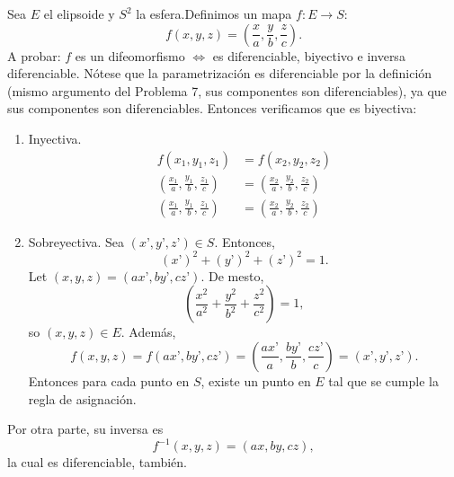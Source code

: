 \begin{problema}
\begin{enumerate}
\begin{sol}
            Sea $E$ el elipsoide y $S^2$ la esfera.Definimos un mapa $f: E \rightarrow S$:  $$ f(x,y,z) = \left(\frac{x}{a},\frac{y}{b},\frac{z}{c}\right). $$ A probar: $f$ es un difeomorfismo $\iff$ es diferenciable, biyectivo e inversa diferenciable. Nótese que la parametrización es diferenciable por la definición (mismo argumento del Problema 7, sus componentes son diferenciables), ya que sus componentes son diferenciables. Entonces verificamos que es biyectiva: 
            \begin{enumerate}
                \item Inyectiva. 
                \begin{align*}
                    f(x_1,y_1,z_1) &= f(x_2,y_2,z_2)\\
                    \left(\frac{x_1}{a},\frac{y_1}{b},\frac{z_1}{c}\right) &= \left(\frac{x_2}{a},\frac{y_2}{b},\frac{z_2}{c}\right)\\
                    \left(\frac{x_1}{a},\frac{y_1}{b},\frac{z_1}{c}\right) &= \left(\frac{x_2}{a},\frac{y_2}{b},\frac{z_2}{c}\right)
                \end{align*}
                \item Sobreyectiva. Sea $(x’,y’,z’) \in S$. Entonces, $$ (x’)^2 + (y’)^2 + (z’)^2 = 1. $$ Let $(x,y,z) = (ax’,by’,cz’)$. De mesto, $$ \left(\frac{x^2}{a^2}+\frac{y^2}{b^2}+\frac{z^2}{c^2}\right) = 1, $$ so $(x,y,z) \in E$. Además, $$ f(x,y,z) = f(ax’,by’,cz’) = \left(\frac{ax’}{a},\frac{by’}{b},\frac{cz’}{c}\right) = (x’,y’,z’). $$ Entonces para cada punto en $S$, existe un punto en  $E$ tal que se cumple la regla de asignación. 
            \end{enumerate}

Por otra parte, su inversa es $$ f^{-1}(x,y,z)=(ax,by,cz), $$
la cual es diferenciable, también. 

        \end{sol}
        
    \end{enumerate}
\end{problema}
%
%

